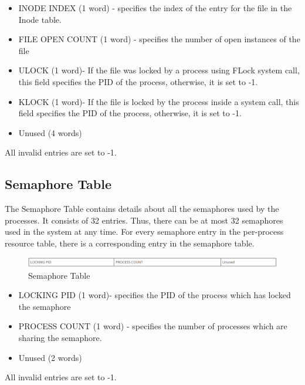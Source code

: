 \begin {itemize}
\item INODE INDEX (1 word) - specifies the index of the entry for the file in the Inode table.
\item FILE OPEN COUNT (1 word) - specifies the number of open instances of the file
\item ULOCK (1 word)- If the file was locked by a process using FLock system call, this field specifies the PID of the process, otherwise, it is set to -1.
\item KLOCK (1 word)- If the file is locked by the process inside a system call, this field specifies the PID of the process, otherwise, it is set to -1.
\item Unused (4 words)
\end {itemize}
All invalid entries are set to -1.

\subsection {Semaphore Table}

The Semaphore Table contains details about all the semaphores used by the processes. It consists of 32 entries. Thus, there can be at most 32 semaphores used in the system at any time. For every semaphore entry in the per-process resource table, there is a corresponding entry in the semaphore table.
\\
\begin{figure}[ht]
\centering
\includegraphics  [scale=0.55]{figures/st.png}
\caption{\footnotesize Semaphore Table}
\end{figure}

\begin {itemize}

\item LOCKING PID (1 word)- specifies the PID of the process which has locked the semaphore
\item PROCESS COUNT (1 word) - specifies the number of processes which are sharing the semaphore.
\item Unused (2 words)
\end {itemize}

All invalid entries are set to -1.

